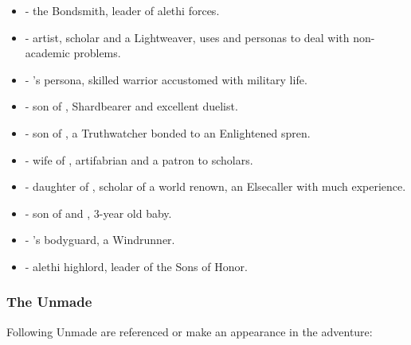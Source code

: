 \begin{itemize}
	\item \npcDalinar[s]{} - the Bondsmith, leader of alethi forces.
	
	\item \npcShallan[s]{} - artist, scholar and a Lightweaver, uses \npcVeil{} and \npcRadiant{} personas to deal with non-academic problems.
	
	\item \npcRadiant[s]{} - \npcShallan{}'s persona, skilled warrior accustomed with military life.
	
	\item \npcAdolin[s]{} - son of \npcDalinar{}, Shardbearer and excellent duelist.
	
	\item \npcRenarin[s]{} - son of \npcDalinar{}, a Truthwatcher bonded to an Enlightened spren.
	
	\item \npcNavani[s]{} - wife of \npcDalinar{}, artifabrian and a patron to scholars.
	
	\item \npcJasnah[s]{} - daughter of \npcNavani{}, scholar of a world renown, an Elsecaller with much experience.
	
	\item \npcGavinor[s]{} - son of \npcElhokar{} and \npcQueen{}, 3-year old baby.
	
	\item \npcKaladin[s]{} - \npcDalinar{}'s bodyguard, a Windrunner.
	
	\item \npcAmaram[s]{} - alethi highlord, leader of the Sons of Honor.
\end{itemize}




\subsubsection{The Unmade}

Following Unmade are referenced or make an appearance in the adventure:

